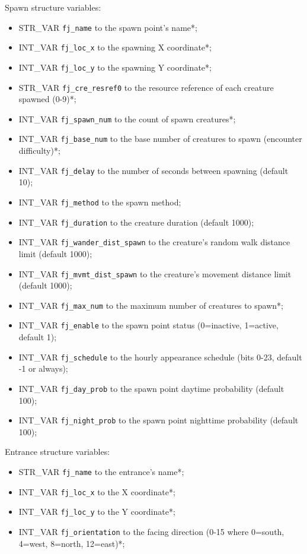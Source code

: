 \documentclass{article}
\begin{document}
Spawn structure variables:
\begin{itemize}
\item STR_VAR \verb+fj_name+ to the spawn point's name*;
\item INT_VAR \verb+fj_loc_x+ to the spawning X coordinate*;
\item INT_VAR \verb+fj_loc_y+ to the spawning Y coordinate*;
\item STR_VAR \verb+fj_cre_resref0+ to the resource reference of each creature spawned (0-9)*;
\item INT_VAR \verb+fj_spawn_num+ to the count of spawn creatures*;
\item INT_VAR \verb+fj_base_num+ to the base number of creatures to spawn (encounter difficulty)*;
\item INT_VAR \verb+fj_delay+ to the number of seconds between spawning (default 10);
\item INT_VAR \verb+fj_method+ to the spawn method;
\item INT_VAR \verb+fj_duration+ to the creature duration (default 1000);
\item INT_VAR \verb+fj_wander_dist_spawn+ to the creature's random walk distance limit (default 1000);
\item INT_VAR \verb+fj_mvmt_dist_spawn+ to the creature's movement distance limit (default 1000);
\item INT_VAR \verb+fj_max_num+ to the maximum number of creatures to spawn*;
\item INT_VAR \verb+fj_enable+ to the spawn point status (0=inactive, 1=active, default 1);
\item INT_VAR \verb+fj_schedule+ to the hourly appearance schedule (bits 0-23, default -1 or always);
\item INT_VAR \verb+fj_day_prob+ to the spawn point daytime probability (default 100);
\item INT_VAR \verb+fj_night_prob+ to the spawn point nighttime probability (default 100);
\end{itemize}
Entrance structure variables:
\begin{itemize}
\item STR_VAR \verb+fj_name+ to the entrance's name*;
\item INT_VAR \verb+fj_loc_x+ to the X coordinate*;
\item INT_VAR \verb+fj_loc_y+ to the Y coordinate*;
\item INT_VAR \verb+fj_orientation+ to the facing direction (0-15 where 0=south, 4=west, 8=north, 12=east)*;
\end{itemize}
\end{document}
